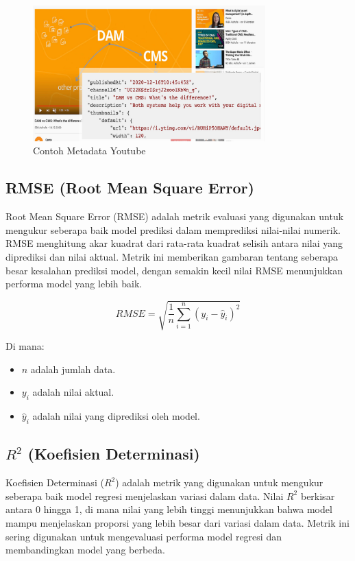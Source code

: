 \begin{figure}[ht]
    \centering
    \includegraphics[width=0.8\textwidth]{gambar/youtube-metadata.png}
    \caption{Contoh Metadata Youtube}
    \label{fig:metadata_youtube}
\end{figure}

\subsection{RMSE (Root Mean Square Error)}
Root Mean Square Error (RMSE) adalah metrik evaluasi yang digunakan untuk mengukur seberapa baik model prediksi dalam memprediksi nilai-nilai numerik. RMSE menghitung akar kuadrat dari rata-rata kuadrat selisih antara nilai yang diprediksi dan nilai aktual. Metrik ini memberikan gambaran tentang seberapa besar kesalahan prediksi model, dengan semakin kecil nilai RMSE menunjukkan performa model yang lebih baik.

\begin{equation}
    RMSE = \sqrt{\frac{1}{n} \sum_{i=1}^{n} (y_i - \hat{y}_i)^2}
\end{equation}

Di mana:
\begin{itemize}
    \item $n$ adalah jumlah data.
    \item $y_i$ adalah nilai aktual.
    \item $\hat{y}_i$ adalah nilai yang diprediksi oleh model.
\end{itemize}

\subsection{$R^2$ (Koefisien Determinasi)}
Koefisien Determinasi ($R^2$) adalah metrik yang digunakan untuk mengukur seberapa baik model regresi menjelaskan variasi dalam data. Nilai $R^2$ berkisar antara 0 hingga 1, di mana nilai yang lebih tinggi menunjukkan bahwa model mampu menjelaskan proporsi yang lebih besar dari variasi dalam data. Metrik ini sering digunakan untuk mengevaluasi performa model regresi dan membandingkan model yang berbeda.

